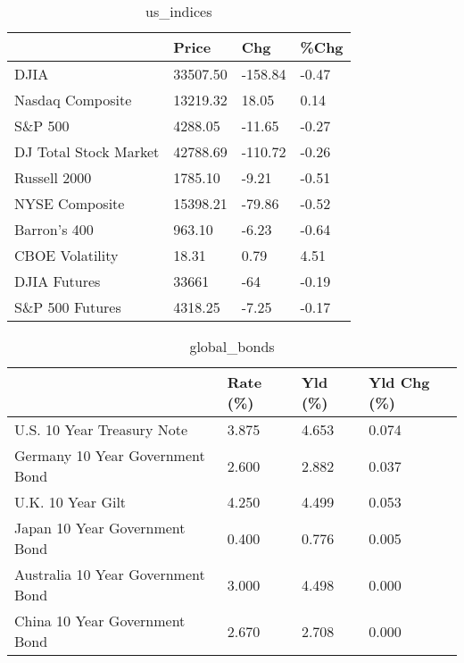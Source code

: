 \documentclass{article}%
\begin{document}
%


\begin{table}[htbp]%
\caption{us\_indices}%
\centering%
\begin{adjustbox}{width=1\textwidth}%
\begin{tabular}{llll}
\toprule
                      &    Price &     Chg &  \%Chg \\
\midrule
                 DJIA & 33507.50 & -158.84 & -0.47 \\
     Nasdaq Composite & 13219.32 &   18.05 &  0.14 \\
              S\&P 500 &  4288.05 &  -11.65 & -0.27 \\
DJ Total Stock Market & 42788.69 & -110.72 & -0.26 \\
         Russell 2000 &  1785.10 &   -9.21 & -0.51 \\
       NYSE Composite & 15398.21 &  -79.86 & -0.52 \\
         Barron's 400 &   963.10 &   -6.23 & -0.64 \\
      CBOE Volatility &    18.31 &    0.79 &  4.51 \\
         DJIA Futures &    33661 &     -64 & -0.19 \\
      S\&P 500 Futures &  4318.25 &   -7.25 & -0.17 \\
\bottomrule
\end{tabular}
%
\end{adjustbox}%
\end{table}

%


\begin{table}[htbp]%
\caption{global\_bonds}%
\centering%
\begin{adjustbox}{width=1\textwidth}%
\begin{tabular}{llll}
\toprule
                                  & Rate (\%) & Yld (\%) & Yld Chg (\%) \\
\midrule
       U.S. 10 Year Treasury Note &    3.875 &   4.653 &       0.074 \\
  Germany 10 Year Government Bond &    2.600 &   2.882 &       0.037 \\
                U.K. 10 Year Gilt &    4.250 &   4.499 &       0.053 \\
    Japan 10 Year Government Bond &    0.400 &   0.776 &       0.005 \\
Australia 10 Year Government Bond &    3.000 &   4.498 &       0.000 \\
    China 10 Year Government Bond &    2.670 &   2.708 &       0.000 \\
\bottomrule
\end{tabular}
%
\end{adjustbox}%
\end{table}
\end{document}

